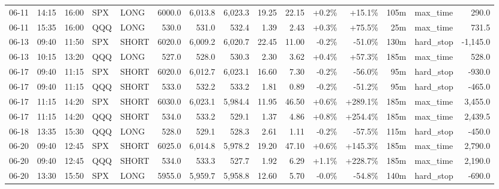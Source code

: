 \documentclass[11pt,a4paper,twoside]{article}
\begin{document}
\begin{landscape}
\begin{center}
\begin{longtable}{>{\color{txtmain}}l l l l l r r r r r r r r >{\color{txtmain}}l r}
06-11 & 14:15 & 16:00 & SPX & LONG & 6000.0 & 6,013.8 & 6,023.3 & 19.25 & 22.15 & \textcolor{wingreen}{+0.2\%} & \textcolor{wingreen}{+15.1\%} & 105m & max\_time & \textcolor{wingreen}{290.0} \\
06-11 & 15:35 & 16:00 & QQQ & LONG & 530.0 & 531.0 & 532.4 & 1.39 & 2.43 & \textcolor{wingreen}{+0.3\%} & \textcolor{wingreen}{+75.5\%} & 25m & max\_time & \textcolor{wingreen}{731.5} \\
06-13 & 09:40 & 11:50 & SPX & SHORT & 6020.0 & 6,009.2 & 6,020.7 & 22.45 & 11.00 & \textcolor{lossred}{-0.2\%} & \textcolor{lossred}{-51.0\%} & 130m & hard\_stop & \textcolor{lossred}{-1,145.0} \\
06-13 & 10:15 & 13:20 & QQQ & LONG & 527.0 & 528.0 & 530.3 & 2.30 & 3.62 & \textcolor{wingreen}{+0.4\%} & \textcolor{wingreen}{+57.3\%} & 185m & max\_time & \textcolor{wingreen}{528.0} \\
06-17 & 09:40 & 11:15 & SPX & SHORT & 6020.0 & 6,012.7 & 6,023.1 & 16.60 & 7.30 & \textcolor{lossred}{-0.2\%} & \textcolor{lossred}{-56.0\%} & 95m & hard\_stop & \textcolor{lossred}{-930.0} \\
06-17 & 09:40 & 11:15 & QQQ & SHORT & 533.0 & 532.2 & 533.2 & 1.81 & 0.89 & \textcolor{lossred}{-0.2\%} & \textcolor{lossred}{-51.2\%} & 95m & hard\_stop & \textcolor{lossred}{-465.0} \\
06-17 & 11:15 & 14:20 & SPX & SHORT & 6030.0 & 6,023.1 & 5,984.4 & 11.95 & 46.50 & \textcolor{wingreen}{+0.6\%} & \textcolor{wingreen}{+289.1\%} & 185m & max\_time & \textcolor{wingreen}{3,455.0} \\
06-17 & 11:15 & 14:20 & QQQ & SHORT & 534.0 & 533.2 & 529.1 & 1.37 & 4.86 & \textcolor{wingreen}{+0.8\%} & \textcolor{wingreen}{+254.4\%} & 185m & max\_time & \textcolor{wingreen}{2,439.5} \\
06-18 & 13:35 & 15:30 & QQQ & LONG & 528.0 & 529.1 & 528.3 & 2.61 & 1.11 & \textcolor{lossred}{-0.2\%} & \textcolor{lossred}{-57.5\%} & 115m & hard\_stop & \textcolor{lossred}{-450.0} \\
06-20 & 09:40 & 12:45 & SPX & SHORT & 6025.0 & 6,014.8 & 5,978.2 & 19.20 & 47.10 & \textcolor{wingreen}{+0.6\%} & \textcolor{wingreen}{+145.3\%} & 185m & max\_time & \textcolor{wingreen}{2,790.0} \\
06-20 & 09:40 & 12:45 & QQQ & SHORT & 534.0 & 533.3 & 527.7 & 1.92 & 6.29 & \textcolor{wingreen}{+1.1\%} & \textcolor{wingreen}{+228.7\%} & 185m & max\_time & \textcolor{wingreen}{2,190.0} \\
06-20 & 13:30 & 15:50 & SPX & LONG & 5955.0 & 5,959.7 & 5,958.8 & 12.60 & 5.70 & \textcolor{lossred}{-0.0\%} & \textcolor{lossred}{-54.8\%} & 140m & hard\_stop & \textcolor{lossred}{-690.0} \\

\end{longtable}
\end{center}
\end{landscape}
\end{document}
